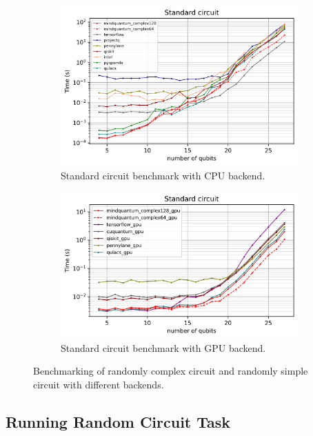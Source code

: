 \begin{figure}
\begin{subfigure}{0.45\textwidth}
        \includegraphics[width=\textwidth]{images/7_Simple_circuit_CPU.png}
        \caption{Standard circuit benchmark with CPU backend.}
        \label{7_random_circ_cpu}
    \end{subfigure}
    \begin{subfigure}{0.45\textwidth}
        \centering
        \includegraphics[width=\textwidth]{images/7_Simple_circuit_GPU.png}
        \caption{Standard circuit benchmark with GPU backend.}
        \label{7_random_circ_gpu}
    \end{subfigure}
    \caption{Benchmarking of randomly complex circuit and randomly simple circuit with different backends.}
    \label{fig:benchmark_circ}
\end{figure}

\subsection{Running Random Circuit Task}

